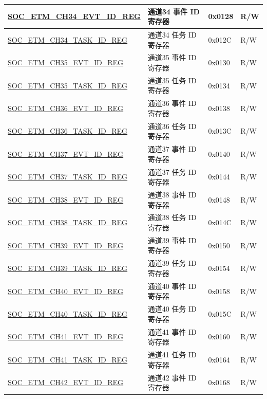 \begin{longtable}{ | p{6cm} | p{6.2cm} | p{1.3cm} | p{2cm} | }
\hyperref[regdesc:SOCETMCHNEVTIDREG]{SOC\_ETM\_CH34\_EVT\_ID\_REG} & 通道34 事件 ID 寄存器 & 0x0128 & R/W \\ \hline
\hyperref[regdesc:SOCETMCHNTASKIDREG]{SOC\_ETM\_CH34\_TASK\_ID\_REG} & 通道34 任务 ID 寄存器 & 0x012C & R/W \\ \hline
\hyperref[regdesc:SOCETMCHNEVTIDREG]{SOC\_ETM\_CH35\_EVT\_ID\_REG} & 通道35 事件 ID 寄存器 & 0x0130 & R/W \\ \hline
\hyperref[regdesc:SOCETMCHNTASKIDREG]{SOC\_ETM\_CH35\_TASK\_ID\_REG} & 通道35 任务 ID 寄存器 & 0x0134 & R/W \\ \hline
\hyperref[regdesc:SOCETMCHNEVTIDREG]{SOC\_ETM\_CH36\_EVT\_ID\_REG} & 通道36 事件 ID 寄存器 & 0x0138 & R/W \\ \hline
\hyperref[regdesc:SOCETMCHNTASKIDREG]{SOC\_ETM\_CH36\_TASK\_ID\_REG} & 通道36 任务 ID 寄存器 & 0x013C & R/W \\ \hline
\hyperref[regdesc:SOCETMCHNEVTIDREG]{SOC\_ETM\_CH37\_EVT\_ID\_REG} & 通道37 事件 ID 寄存器 & 0x0140 & R/W \\ \hline
\hyperref[regdesc:SOCETMCHNTASKIDREG]{SOC\_ETM\_CH37\_TASK\_ID\_REG} & 通道37 任务 ID 寄存器 & 0x0144 & R/W \\ \hline
\hyperref[regdesc:SOCETMCHNEVTIDREG]{SOC\_ETM\_CH38\_EVT\_ID\_REG} & 通道38 事件 ID 寄存器 & 0x0148 & R/W \\ \hline
\hyperref[regdesc:SOCETMCHNTASKIDREG]{SOC\_ETM\_CH38\_TASK\_ID\_REG} & 通道38 任务 ID 寄存器 & 0x014C & R/W \\ \hline
\hyperref[regdesc:SOCETMCHNEVTIDREG]{SOC\_ETM\_CH39\_EVT\_ID\_REG} & 通道39 事件 ID 寄存器 & 0x0150 & R/W \\ \hline
\hyperref[regdesc:SOCETMCHNTASKIDREG]{SOC\_ETM\_CH39\_TASK\_ID\_REG} & 通道39 任务 ID 寄存器 & 0x0154 & R/W \\ \hline
\hyperref[regdesc:SOCETMCHNEVTIDREG]{SOC\_ETM\_CH40\_EVT\_ID\_REG} & 通道40 事件 ID 寄存器 & 0x0158 & R/W \\ \hline
\hyperref[regdesc:SOCETMCHNTASKIDREG]{SOC\_ETM\_CH40\_TASK\_ID\_REG} & 通道40 任务 ID 寄存器 & 0x015C & R/W \\ \hline
\hyperref[regdesc:SOCETMCHNEVTIDREG]{SOC\_ETM\_CH41\_EVT\_ID\_REG} & 通道41 事件 ID 寄存器 & 0x0160 & R/W \\ \hline
\hyperref[regdesc:SOCETMCHNTASKIDREG]{SOC\_ETM\_CH41\_TASK\_ID\_REG} & 通道41 任务 ID 寄存器 & 0x0164 & R/W \\ \hline
\hyperref[regdesc:SOCETMCHNEVTIDREG]{SOC\_ETM\_CH42\_EVT\_ID\_REG} & 通道42 事件 ID 寄存器 & 0x0168 & R/W \\ \hline

\end{longtable}
